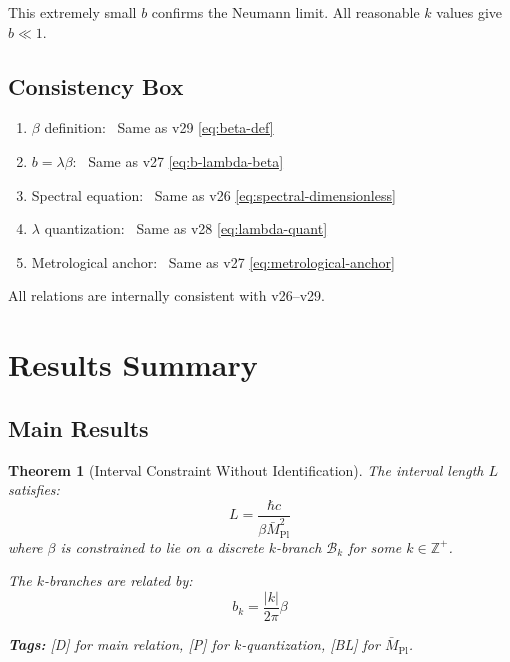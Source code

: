 \documentclass[11pt,a4paper]{article}
\newtheorem{theorem}{Theorem}[section]
\begin{document}
This extremely small $b$ confirms the Neumann limit. All reasonable $k$ values
give $b \ll 1$.

\subsection{Consistency Box}

\begin{tcolorbox}[colback=white, colframe=black, title=Consistency Verification]
\begin{enumerate}
  \item $\beta$ definition: \checkmark\ Same as v29 \eqref{eq:beta-def}
  \item $b = \lambda\beta$: \checkmark\ Same as v27 \eqref{eq:b-lambda-beta}
  \item Spectral equation: \checkmark\ Same as v26 \eqref{eq:spectral-dimensionless}
  \item $\lambda$ quantization: \checkmark\ Same as v28 \eqref{eq:lambda-quant}
  \item Metrological anchor: \checkmark\ Same as v27 \eqref{eq:metrological-anchor}
\end{enumerate}
All relations are internally consistent with v26--v29.
\end{tcolorbox}

\section{Results Summary}
\label{sec:results}

\subsection{Main Results}

\begin{theorem}[Interval Constraint Without Identification]
\label{thm:main}
The interval length $L$ satisfies:
\begin{equation}
  \boxed{L = \frac{\hbar c}{\beta \bar{M}_{\text{Pl}}^2}}
  \label{eq:main-result}
\end{equation}
where $\beta$ is constrained to lie on a discrete $k$-branch $\mathcal{B}_k$
for some $k \in \mathbb{Z}^+$.

The $k$-branches are related by:
\begin{equation}
  b_k = \frac{|k|}{2\pi} \beta
  \label{eq:k-branch-relation}
\end{equation}

\textbf{Tags:} [D] for main relation, [P] for $k$-quantization, [BL] for $\bar{M}_{\text{Pl}}$.
\end{theorem}
\end{document}
